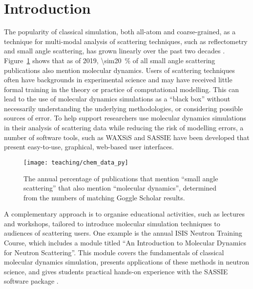 \section{Introduction}
The popularity of classical simulation, both all-atom and coarse-grained, as a technique for multi-modal analysis of scattering techniques, such as reflectometry and small angle scattering, has grown linearly over the past two decades \cite{pan_molecular_2012,boldon_review_2015,hub_interpreting_2018,koutsioubas_combined_2016,darre_molecular_2015,scoppola_combining_2018}.
Figure~\ref{fig:growth} shows that as of 2019, \SI{\sim20}{\percent} of all small angle scattering publications also mention molecular dynamics.
Users of scattering techniques often have backgrounds in experimental science and may have received little formal training in the theory or practice of computational modelling.
This can lead to the use of molecular dynamics simulations as a ``black box'' without necessarily understanding the underlying methodologies, or considering possible sources of error.
To help support researchers use molecular dynamics simulations in their analysis of scattering data while reducing the risk of modelling errors, a number of software tools, such as WAXSiS \cite{chen_validating_2014,knight_waxsis_2015} and SASSIE \cite{perkins_atomistic_2016} have been developed that present easy-to-use, graphical, web-based user interfaces.
%
\begin{figure}
    \centering
    \texttt{[image: teaching/chem\_data\_py]}
    \caption{The annual percentage of publications that mention ``small angle scattering'' that also mention ``molecular dynamics'', determined from the numbers of matching Goggle Scholar results.}
    \label{fig:growth}
\end{figure}
%

A complementary approach is to organise educational activities, such as lectures and workshops, tailored to introduce molecular simulation techniques to audiences of scattering users.
One example is the annual ISIS Neutron Training Course, which includes a module titled ``An Introduction to Molecular Dynamics for Neutron Scattering''.
This module covers the fundamentals of classical molecular dynamics simulation, presents applications of these methods in neutron science, and gives students practical hands-on experience with the SASSIE software package \cite{perkins_atomistic_2016}.

